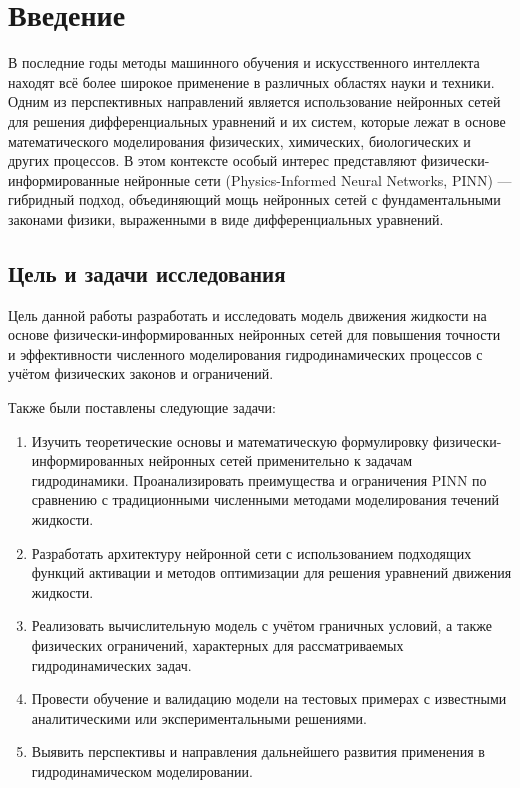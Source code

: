\chapter{Введение}

В последние годы методы машинного обучения и искусственного интеллекта находят всё
более широкое применение в различных областях науки и техники. Одним из перспективных
направлений является использование нейронных сетей для решения дифференциальных
уравнений и их систем, которые лежат в основе математического моделирования физических,
химических, биологических и других процессов. В этом контексте особый интерес представляют
физически-информированные нейронные сети (Physics-Informed Neural Networks, PINN) ---
гибридный подход, объединяющий мощь нейронных сетей с фундаментальными законами физики,
выраженными в виде дифференциальных уравнений.

\section{Цель и задачи исследования}
Цель данной работы разработать и исследовать модель движения жидкости на основе
физически-информированных нейронных сетей для повышения точности и эффективности
численного моделирования гидродинамических процессов с учётом физических законов
и ограничений.

Также были поставлены следующие задачи:
\begin{enumerate}
    \item Изучить теоретические основы и математическую формулировку физически-информированных
    нейронных сетей применительно к задачам гидродинамики.
    Проанализировать преимущества и ограничения PINN по сравнению с традиционными численными
    методами моделирования течений жидкости.
    
    \item Разработать архитектуру нейронной сети с использованием подходящих функций активации и
    методов оптимизации для решения уравнений движения жидкости.
    
    \item Реализовать вычислительную модель с учётом граничных условий, а также
    физических ограничений, характерных для рассматриваемых гидродинамических задач.
    
    \item Провести обучение и валидацию модели на тестовых примерах с известными аналитическими
    или экспериментальными решениями.
    
    \item Выявить перспективы и направления дальнейшего развития применения  в
    гидродинамическом моделировании.
\end{enumerate}
